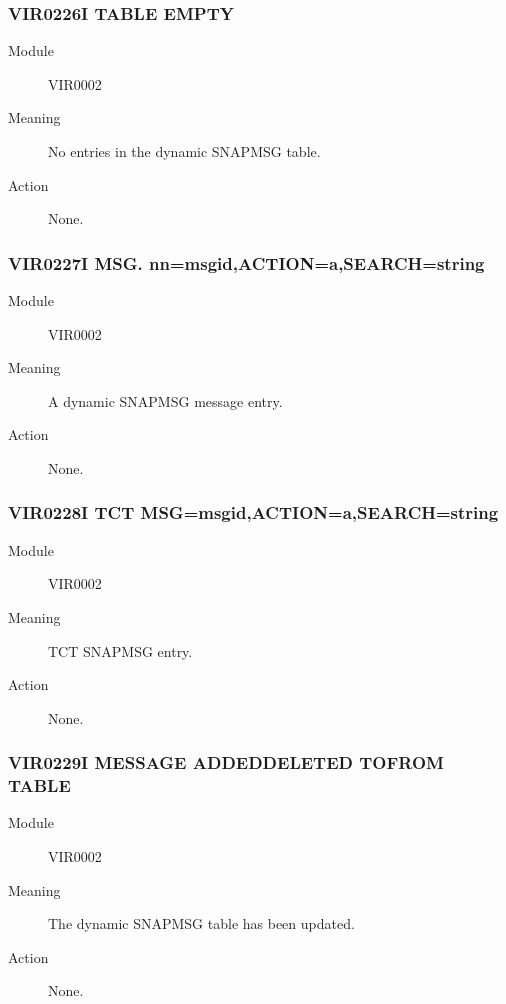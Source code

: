 \documentclass[letterpaper,10pt,english]{sphinxmanual}
\begin{document}
\subsubsection{VIR0226I TABLE EMPTY}
\label{\detokenize{messages:vir0226i-table-empty}}\begin{description}
\item[{Module}] \leavevmode
VIR0002

\item[{Meaning}] \leavevmode
No entries in the dynamic SNAPMSG table.

\item[{Action}] \leavevmode
None.

\end{description}


\subsubsection{VIR0227I MSG. nn=msgid,ACTION=a,SEARCH=string}
\label{\detokenize{messages:vir0227i-msg-nn-msgid-action-a-search-string}}\begin{description}
\item[{Module}] \leavevmode
VIR0002

\item[{Meaning}] \leavevmode
A dynamic SNAPMSG message entry.

\item[{Action}] \leavevmode
None.

\end{description}


\subsubsection{VIR0228I TCT MSG=msgid,ACTION=a,SEARCH=string}
\label{\detokenize{messages:vir0228i-tct-msg-msgid-action-a-search-string}}\begin{description}
\item[{Module}] \leavevmode
VIR0002

\item[{Meaning}] \leavevmode
TCT SNAPMSG entry.

\item[{Action}] \leavevmode
None.

\end{description}


\subsubsection{VIR0229I MESSAGE ADDED\textbar{}DELETED TO\textbar{}FROM TABLE}
\label{\detokenize{messages:vir0229i-message-added-deleted-to-from-table}}\begin{description}
\item[{Module}] \leavevmode
VIR0002

\item[{Meaning}] \leavevmode
The dynamic SNAPMSG table has been updated.

\item[{Action}] \leavevmode
None.

\end{description}
\end{document}
